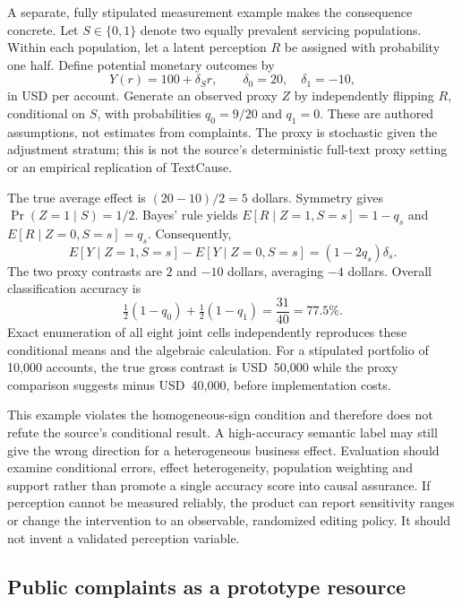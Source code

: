 A separate, fully stipulated measurement example makes the consequence concrete. Let $S\in\{0,1\}$ denote two equally prevalent servicing populations. Within each population, let a latent perception $R$ be assigned with probability one half. Define potential monetary outcomes by
\begin{equation}
 Y(r)=100+\delta_S r,\qquad \delta_0=20,\quad\delta_1=-10,
 \label{eq:exec28-lm-witness}
\end{equation}
in USD per account. Generate an observed proxy $Z$ by independently flipping $R$, conditional on $S$, with probabilities $q_0=9/20$ and $q_1=0$. These are authored assumptions, not estimates from complaints. The proxy is stochastic given the adjustment stratum; this is not the source's deterministic full-text proxy setting or an empirical replication of TextCause.

The true average effect is $(20-10)/2=5$ dollars. Symmetry gives $\Pr(Z=1\mid S)=1/2$. Bayes' rule yields $E[R\mid Z=1,S=s]=1-q_s$ and $E[R\mid Z=0,S=s]=q_s$. Consequently,
\begin{equation}
 E[Y\mid Z=1,S=s]-E[Y\mid Z=0,S=s]=(1-2q_s)\delta_s.
\end{equation}
The two proxy contrasts are $2$ and $-10$ dollars, averaging $-4$ dollars. Overall classification accuracy is
\begin{equation}
 \tfrac12(1-q_0)+\tfrac12(1-q_1)=\frac{31}{40}=77.5\%.
\end{equation}
Exact enumeration of all eight joint cells independently reproduces these conditional means and the algebraic calculation. For a stipulated portfolio of 10,000 accounts, the true gross contrast is USD~50,000 while the proxy comparison suggests minus USD~40,000, before implementation costs.\citep{exec28_lm_reference}

This example violates the homogeneous-sign condition and therefore does not refute the source's conditional result. A high-accuracy semantic label may still give the wrong direction for a heterogeneous business effect. Evaluation should examine conditional errors, effect heterogeneity, population weighting and support rather than promote a single accuracy score into causal assurance. If perception cannot be measured reliably, the product can report sensitivity ranges or change the intervention to an observable, randomized editing policy. It should not invent a validated perception variable.

\subsection{Public complaints as a prototype resource}

